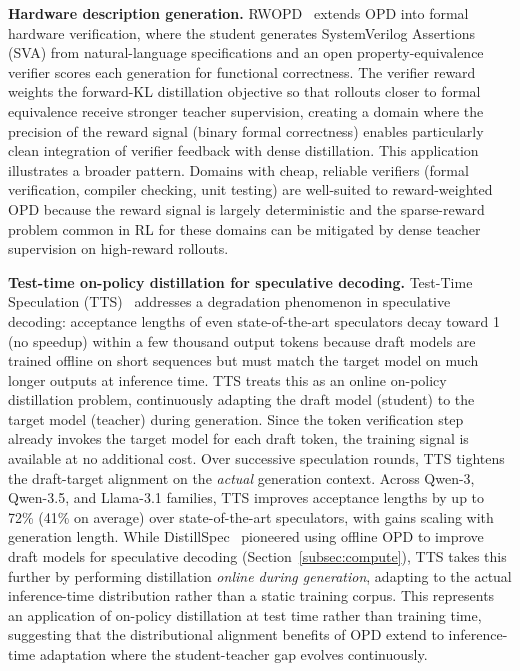 \documentclass{article} %
\begin{document}
\textbf{Hardware description generation.} RWOPD~\citep{2605.13501} extends OPD into formal hardware verification, where the student generates SystemVerilog Assertions (SVA) from natural-language specifications and an open property-equivalence verifier scores each generation for functional correctness. The verifier reward weights the forward-KL distillation objective so that rollouts closer to formal equivalence receive stronger teacher supervision, creating a domain where the precision of the reward signal (binary formal correctness) enables particularly clean integration of verifier feedback with dense distillation. This application illustrates a broader pattern. Domains with cheap, reliable verifiers (formal verification, compiler checking, unit testing) are well-suited to reward-weighted OPD because the reward signal is largely deterministic and the sparse-reward problem common in RL for these domains can be mitigated by dense teacher supervision on high-reward rollouts.

\textbf{Test-time on-policy distillation for speculative decoding.} Test-Time Speculation (TTS)~\citep{2605.09329} addresses a degradation phenomenon in speculative decoding: acceptance lengths of even state-of-the-art speculators decay toward 1 (no speedup) within a few thousand output tokens because draft models are trained offline on short sequences but must match the target model on much longer outputs at inference time. TTS treats this as an online on-policy distillation problem, continuously adapting the draft model (student) to the target model (teacher) during generation. Since the token verification step already invokes the target model for each draft token, the training signal is available at no additional cost. Over successive speculation rounds, TTS tightens the draft-target alignment on the \emph{actual} generation context. Across Qwen-3, Qwen-3.5, and Llama-3.1 families, TTS improves acceptance lengths by up to 72\% (41\% on average) over state-of-the-art speculators, with gains scaling with generation length. While DistillSpec~\citep{2310.08461} pioneered using offline OPD to improve draft models for speculative decoding (Section~\ref{subsec:compute}), TTS takes this further by performing distillation \emph{online during generation}, adapting to the actual inference-time distribution rather than a static training corpus. This represents an application of on-policy distillation at test time rather than training time, suggesting that the distributional alignment benefits of OPD extend to inference-time adaptation where the student-teacher gap evolves continuously.
\end{document}
